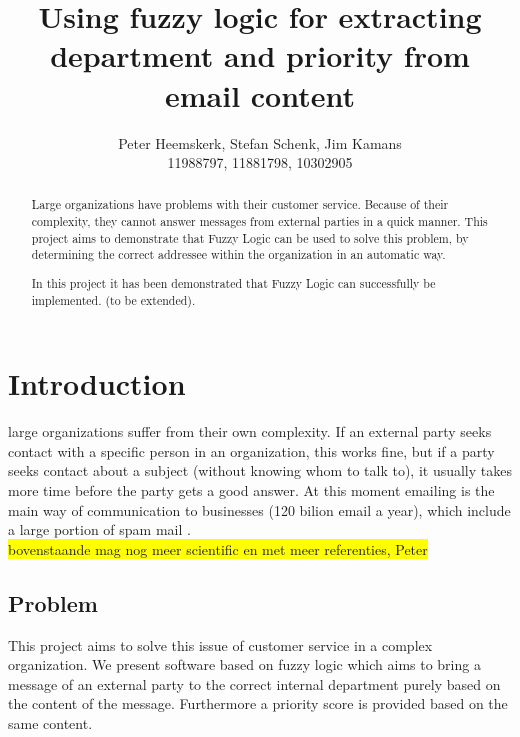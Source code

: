 \documentclass[journal]{IEEEtran}
\begin{document}
\title{Using fuzzy logic for extracting department and priority from email content}
\author{Peter Heemskerk, Stefan Schenk, Jim Kamans\\11988797, 11881798, 10302905}


\maketitle

\begin{abstract}
Large organizations have problems with their customer service. 
Because of their complexity, they cannot answer messages from external parties in a quick manner. This project aims to demonstrate that Fuzzy Logic can be used to solve this problem, by determining the correct addressee within the organization in an automatic way.

In this project it has been demonstrated that Fuzzy Logic can successfully be implemented. (to be extended).
\end{abstract}

\section{Introduction}
 large organizations suffer from their own complexity. If an external party seeks contact with a specific person in an organization, this works fine, but if a party seeks contact about a subject (without knowing whom to talk to), it usually takes more time before the party gets a good answer. At this moment emailing is the main way of communication to businesses (120 bilion email a year), which include a large portion of spam mail \cite{email_statistics}.\\

\colorbox{yellow}{bovenstaande mag nog meer scientific en met meer referenties, Peter}

\subsection{Problem}

This project aims to solve this issue of customer service in a complex organization. We present software based on fuzzy logic which aims to bring a message of an external party to the correct internal department purely based on the content of the message. Furthermore a priority score is provided based on the same content.
\end{document}
